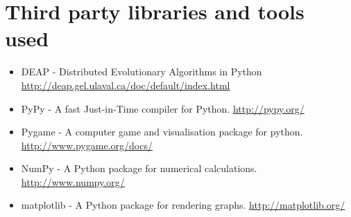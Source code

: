 \documentclass[a4paper,11pt]{kth-mag}
\begin{document}
\appendix
\addappheadtotoc
\chapter{Third party libraries and tools used}
\label{list-of-third-party-tools}
\begin{itemize}
\item DEAP - Distributed Evolutionary Algorithms in Python \url{http://deap.gel.ulaval.ca/doc/default/index.html}
\item PyPy - A fast Just-in-Time compiler for Python. \url{http://pypy.org/}
\item Pygame - A computer game and visualisation package for python. \url{http://www.pygame.org/docs/}
\item NumPy - A Python package for numerical calculations. \url{http://www.numpy.org/}
\item matplotlib - A Python package for rendering graphs. \url{http://matplotlib.org/}
\end{itemize}
\end{document}
